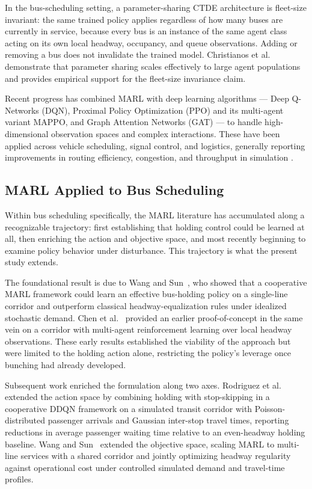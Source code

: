 In the bus-scheduling setting, a parameter-sharing CTDE architecture is fleet-size invariant: the same trained policy applies regardless of how many buses are currently in service, because every bus is an instance of the same agent class acting on its own local headway, occupancy, and queue observations. Adding or removing a bus does not invalidate the trained model. Christianos et al.~\cite{Christianos2021PS} demonstrate that parameter sharing scales effectively to large agent populations and provides empirical support for the fleet-size invariance claim.

Recent progress has combined MARL with deep learning algorithms --- Deep Q-Networks (DQN), Proximal Policy Optimization (PPO) and its multi-agent variant MAPPO, and Graph Attention Networks (GAT) --- to handle high-dimensional observation spaces and complex interactions. These have been applied across vehicle scheduling, signal control, and logistics, generally reporting improvements in routing efficiency, congestion, and throughput in simulation \cite{Li2023Departure,Cao2022Train,Wang2024MultiAGV,Sun2024Graph,Zuo2026AGV,Huang2025Joint,Bokade2023MARL}.

\subsection{MARL Applied to Bus Scheduling}
Within bus scheduling specifically, the MARL literature has accumulated along a recognizable trajectory: first establishing that holding control could be learned at all, then enriching the action and objective space, and most recently beginning to examine policy behavior under disturbance. This trajectory is what the present study extends.

The foundational result is due to Wang and Sun~\cite{Wang2020Holding}, who showed that a cooperative MARL framework could learn an effective bus-holding policy on a single-line corridor and outperform classical headway-equalization rules under idealized stochastic demand. Chen et al.~\cite{Chen2016MARLBus} provided an earlier proof-of-concept in the same vein on a corridor with multi-agent reinforcement learning over local headway observations. These early results established the viability of the approach but were limited to the holding action alone, restricting the policy's leverage once bunching had already developed.

Subsequent work enriched the formulation along two axes. Rodriguez et al.~\cite{Rodriguez2023Cooperative} extended the action space by combining holding with stop-skipping in a cooperative DDQN framework on a simulated transit corridor with Poisson-distributed passenger arrivals and Gaussian inter-stop travel times, reporting reductions in average passenger waiting time relative to an even-headway holding baseline. Wang and Sun~\cite{Wang2023MultiObj} extended the objective space, scaling MARL to multi-line services with a shared corridor and jointly optimizing headway regularity against operational cost under controlled simulated demand and travel-time profiles.

